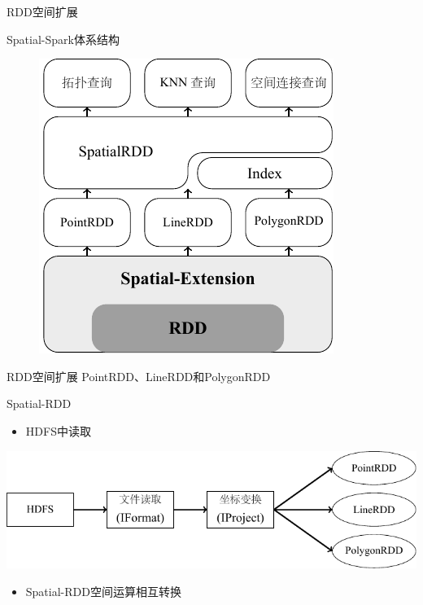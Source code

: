 \begin{frame}[c]{RDD空间扩展}
    \begin{center}
        \alert{Spatial-Spark体系结构}
    

    \vspace{1em}
    \begin{figure}
        \includegraphics[scale=1.0]{figures/spatialspark.pdf}
    \end{figure}
    \end{center}
\end{frame}

\begin{frame}[c]{RDD空间扩展}
    PointRDD、LineRDD和PolygonRDD

    Spatial-RDD
    \pause
    \begin{itemize}
        \item HDFS中读取
    \end{itemize}
    \includegraphics[scale=0.8]{figures/spatialRDD.pdf}

    \pause
    \begin{itemize}
        \item Spatial-RDD空间运算相互转换
    \end{itemize}
\end{frame}

